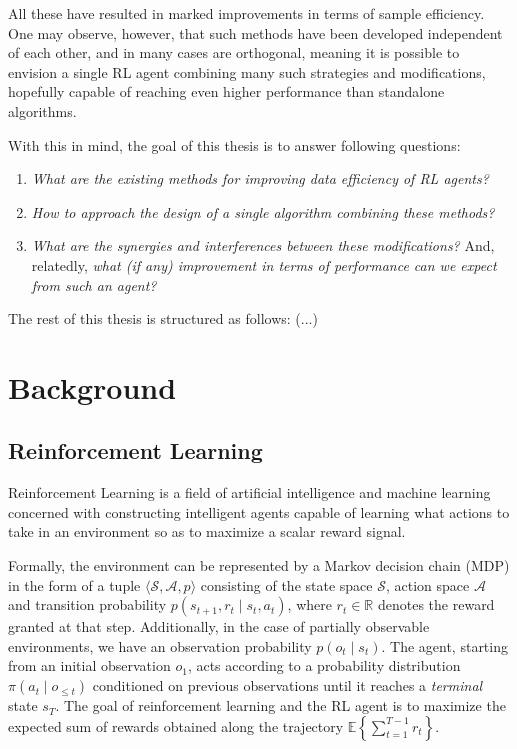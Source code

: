 \documentclass[twoside,11pt]{article}
\begin{document}
All these have resulted in marked improvements in terms of sample efficiency. One may observe, however, that such methods have been developed independent of each other, and in many cases are orthogonal, meaning it is possible to envision a single RL agent combining many such strategies and modifications, hopefully capable of reaching even higher performance than standalone algorithms.

With this in mind, the goal of this thesis is to answer following questions:

\begin{enumerate}
  \item \emph{What are the existing methods for improving data efficiency of RL agents?}
  \item \emph{How to approach the design of a single algorithm combining these methods?}
  \item \emph{What are the synergies and interferences between these modifications?} And, relatedly, \emph{what (if any) improvement in terms of performance can we expect from such an agent?}
\end{enumerate}

The rest of this thesis is structured as follows: (...)

\section{Background}

\subsection{Reinforcement Learning}

Reinforcement Learning is a field of artificial intelligence and machine learning concerned with constructing intelligent agents capable of learning what actions to take in an environment so as to maximize a scalar reward signal.

Formally, the environment can be represented by a Markov decision chain (MDP) in the form of a tuple $\langle \mathcal{S}, \mathcal{A}, p \rangle$ consisting of the state space $\mathcal{S}$, action space $\mathcal{A}$ and transition probability $p(s_{t+1}, r_{t} \mid s_t, a_t)$, where $r_t \in \mathbb{R}$ denotes the reward granted at that step. Additionally, in the case of partially observable environments, we have an observation probability $p(o_t \mid s_t)$. The agent, starting from an initial observation $o_1$, acts according to a probability distribution $\pi(a_t \mid o_{\leq t})$ conditioned on previous observations until it reaches a \emph{terminal} state $s_T$. The goal of reinforcement learning and the RL agent is to maximize the expected sum of rewards obtained along the trajectory $\mathbb{E} \left\{\sum_{t=1}^{T-1} r_t\right\}$.
\end{document}
